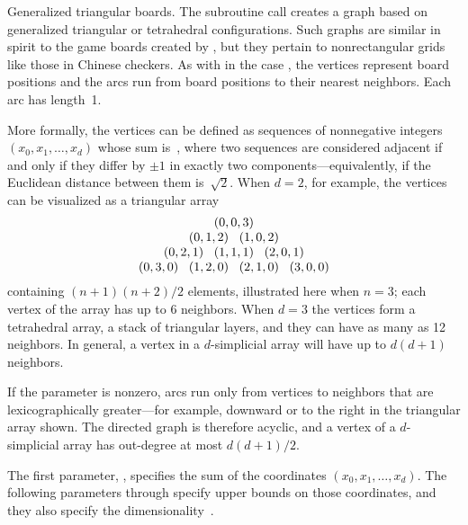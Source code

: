 Generalized triangular boards. The subroutine call
 creates
a graph based on
generalized triangular or tetrahedral configurations. Such graphs are
similar in spirit to the game boards created by , but they
pertain to nonrectangular grids like those in Chinese checkers. As
with  in the case , the vertices represent
board positions
and the arcs run from board positions to their nearest neighbors. Each arc has
length~1.{\par}

More formally, the vertices can be defined as sequences of nonnegative
integers $(x_0,x_1,\ldots,x_d)$ whose sum is~, where two sequences
are considered adjacent if and only if they differ by $\pm1$ in exactly
two components---equivalently, if the Euclidean distance between them
is~$\sqrt2$. When $d=2$, for example, the vertices can be visualized
as a triangular array
$$\vcenter{\halign{&\hbox to 2em{\hss$#$\hss}\cr
&&&(0,0,3)\cr
&&(0,1,2)&&(1,0,2)\cr
&(0,2,1)&&(1,1,1)&&(2,0,1)\cr
(0,3,0)&&(1,2,0)&&(2,1,0)&&(3,0,0)\cr}}$$
containing $(n+1)(n+2)/2$ elements, illustrated here when $n=3$; each vertex of
the array has up to 6 neighbors. When $d=3$ the vertices form a tetrahedral
array, a stack of triangular layers, and they can have as many as 12
neighbors. In general, a vertex in a $d$-simplicial array will have up to
$d(d+1)$ neighbors.

If the  parameter is nonzero, arcs run only from vertices to
neighbors that are lexicographically greater---for example, downward
or to the right in the triangular array shown. The directed graph is
therefore acyclic, and a vertex of a $d$-simplicial array has
out-degree at most $d(d+1)/2$.

\fi

The first parameter, , specifies the sum of the coordinates
$(x_0,x_1,\ldots,x_d)$. The following parameters  through 
specify upper bounds on those coordinates, and they also specify the
dimensionality~.

